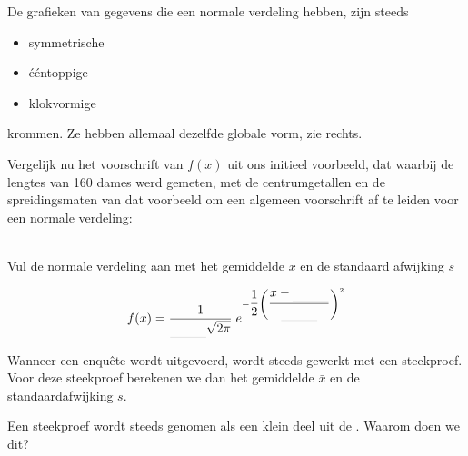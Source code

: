 \documentclass[12pt,twoside,a4paper]{article}
\begin{document}
\begin{minipage}{0.5\textwidth}
De grafieken van gegevens die een normale verdeling hebben, zijn steeds
\begin{itemize}
  \item symmetrische
  \item ééntoppige
  \item klokvormige
\end{itemize}
krommen. Ze hebben allemaal dezelfde globale vorm, zie rechts.
\end{minipage}
\begin{minipage}{0.5\textwidth}
\begin{center}
\end{center}
\end{minipage}

Vergelijk nu het voorschrift van $f(x)$ uit ons initieel voorbeeld, dat waarbij de lengtes van 160 dames werd gemeten, met de centrumgetallen en de spreidingsmaten van dat voorbeeld om een algemeen voorschrift af te leiden voor een normale verdeling:

\begin{oefening}\\
Vul de normale verdeling aan met het gemiddelde $\bar{x}$ en de standaard afwijking $s$

$$f(x)=\dfrac{1}{\arule{1cm}{\sqrt{2\pi}}}\;e^{-\dfrac{1}{2}\left(\dfrac{x-\arule{1cm}}{\arule{1cm}}\right)^2}$$
\end{oefening}

Wanneer een enquête wordt uitgevoerd, wordt steeds gewerkt met een steekproef. Voor deze steekproef berekenen we dan het gemiddelde $\bar{x}$ en de standaardafwijking $s$.

\begin{oefening}
Een steekproef wordt steeds genomen als een klein deel uit de \arule{5cm}. Waarom doen we dit?
\end{oefening}
\end{document}

